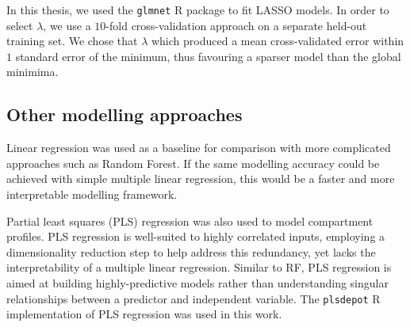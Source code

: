 \documentclass[a4paper,11pt,oneside]{book}
\begin{document}
In this thesis, we used the \texttt{glmnet} R package to fit LASSO models.\cite{glmnet1, glmnet2} In order to select $\lambda$, we use a $10$-fold cross-validation approach on a separate held-out training set. We chose that $\lambda$ which produced a mean cross-validated error within $1$ standard error of the minimum, thus favouring a sparser model than the global minimima.

\subsection{Other modelling approaches}
 
Linear regression was used as a baseline for comparison with more complicated approaches such as Random Forest. If the same modelling accuracy could be achieved with simple multiple linear regression, this would be a faster and more interpretable modelling framework.

Partial least squares (PLS) regression was also used to model compartment profiles. PLS regression is well-suited to highly correlated inputs, employing a dimensionality reduction step to help address this redundancy, yet lacks the interpretability of a multiple linear regression. Similar to RF, PLS regression is aimed at building highly-predictive models rather than understanding singular relationships between a predictor and independent variable.\cite{Tobias1995} The \texttt{plsdepot} R implementation of PLS regression was used in this work.

%
\end{document}
